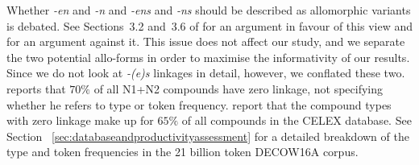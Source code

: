 Whether \textit{-en} and \textit{-n} and \textit{-ens} and \textit{-ns} should be described as allomorphic variants is debated.
See Sections~3.2 and~3.6 of \textcite{NueblingSzczepaniak2013} for an argument in favour of this view and \textcite[33--36]{Neef2015} for an argument against it.
This issue does not affect our study, and we separate the two potential allo-forms in order to maximise the informativity of our results.
Since we do not look at \textit{-(e)s} linkages in detail, however, we conflated these two.
\textcite[177]{Gallmann1999} reports that $70\%$ of all N1+N2 compounds have zero linkage, not specifying whether he refers to type or token frequency.
\textcite[29]{KrottEa2007} report that the compound types with zero linkage make up for $65\%$ of all compounds in the CELEX database.
See Section~ \ref{sec:databaseandproductivityassessment} for a detailed breakdown of the type and token frequencies in the 21 billion token DECOW16A corpus.

